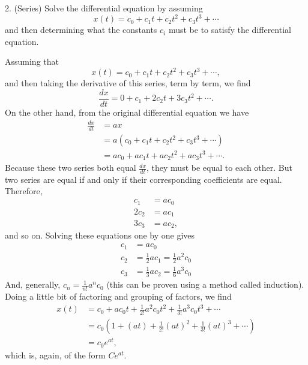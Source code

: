 \documentclass[twoside,openright,titlepage,a4paper]{book}
\begin{document}
\begin{sloppypar}
2. (Series) Solve the differential equation by assuming \[ x(t) = c_0 + c_1 t + c_2 t^2 + c_3t^3 + \dotsb \] and then determining what the constants $c_i$ must be to satisfy the differential equation.
\begin{examplebox}
Assuming that \[ x(t) = c_0 + c_1 t + c_2 t^2 + c_3t^3 + \dotsb, \] and then taking the derivative of this series, term by term, we find \[ \frac{dx}{dt} = 0 + c_1 + 2c_2 t + 3c_3t^2 + \dotsb. \]
On the other hand, from the original differential equation we have
\begin{align*}
\frac{dx}{dt} &= a x \\
& = a \left(c_0 + c_1 t + c_2t^2 + c_3t^3+\dotsb\right) \\
&= ac_0 + ac_1 t + ac_2t^2 + ac_3t^3 + \dotsb.
\end{align*}
Because these two series both equal $\frac{dx}{dt}$, they must be equal to each other. But two series are equal if and only if their corresponding coefficients are equal. Therefore,
\begin{align*}
c_1 &= a c_0 \\
2c_2 &= a c_1 \\
3c_3 &= a c_2, 
\end{align*}
and so on. Solving these equations one by one gives
\begin{align*}
c_1 &= ac_0 \\
c_2 &= \frac{1}{2}a c_1= \frac{1}{2}a^2 c_0 \\
c_3 &= \frac{1}{3}a c_2= \frac{1}{6}a^3 c_0 
\end{align*}
And, generally, $c_n = \frac{1}{n!}a^n c_0$ (this can be proven using a method called induction). Doing a little bit of factoring and grouping of factors, we find
\begin{align*} 
x(t) &= c_0 + ac_0 t + \frac{1}{2!} a^2 c_0 t^2 + \frac{1}{3!} a^3 c_0 t^3 + \dotsb \\
&= c_0 \left(1 + (at) + \frac{1}{2!}(at)^2 +\frac{1}{3!}(at)^3 + \dotsb \right) \\
&= c_0 e^{at}, 
\end{align*}
which is, again, of the form $Ce^{at}$.
\end{examplebox}	


\end{sloppypar}
\end{document}
